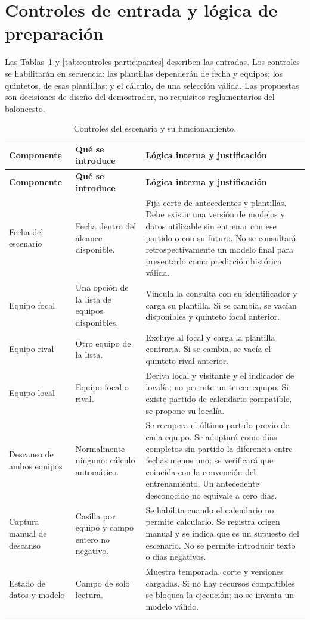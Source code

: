 \section{Controles de entrada y lógica de preparación}
\label{sec:controles-pruebas}
Las Tablas~\ref{tab:controles-escenario} y \ref{tab:controles-participantes} describen las entradas. Los controles se habilitarán en secuencia: las plantillas dependerán de fecha y equipos; los quintetos, de esas plantillas; y el cálculo, de una selección válida. Las propuestas son decisiones de diseño del demostrador, no requisitos reglamentarios del baloncesto.

\begingroup\small{}\setlength{\tabcolsep}{4pt}
\begin{longtable}{@{}>{\raggedright\arraybackslash}p{3.0cm}>{\raggedright\arraybackslash}p{3.1cm}>{\raggedright\arraybackslash}p{8.5cm}@{}}
\caption{Controles del escenario y su funcionamiento.}\label{tab:controles-escenario}\\
\toprule\textbf{Componente}&\textbf{Qué se introduce}&\textbf{Lógica interna y justificación}\\\midrule\endfirsthead
\toprule\textbf{Componente}&\textbf{Qué se introduce}&\textbf{Lógica interna y justificación}\\\midrule\endhead
\bottomrule\endfoot
Fecha del escenario & Fecha dentro del alcance disponible. & Fija corte de antecedentes y plantillas. Debe existir una versión de modelos y datos utilizable sin entrenar con ese partido o con su futuro. No se consultará retrospectivamente un modelo final para presentarlo como predicción histórica válida.\\
Equipo focal & Una opción de la lista de equipos disponibles. & Vincula la consulta con su identificador y carga su plantilla. Si se cambia, se vacían disponibles y quinteto focal anterior.\\
Equipo rival & Otro equipo de la lista. & Excluye al focal y carga la plantilla contraria. Si se cambia, se vacía el quinteto rival anterior.\\
Equipo local & Equipo focal o rival. & Deriva local y visitante y el indicador de localía; no permite un tercer equipo. Si existe partido de calendario compatible, se propone su localía.\\
Descanso de ambos equipos & Normalmente ninguno: cálculo automático. & Se recupera el último partido previo de cada equipo. Se adoptará como días completos sin partido la diferencia entre fechas menos uno; se verificará que coincida con la convención del entrenamiento. Un antecedente desconocido no equivale a cero días.\\
Captura manual de descanso & Casilla por equipo y campo entero no negativo. & Se habilita cuando el calendario no permite calcularlo. Se registra origen manual y se indica que es un supuesto del escenario. No se permite introducir texto o días negativos.\\
Estado de datos y modelo & Campo de solo lectura. & Muestra temporada, corte y versiones cargadas. Si no hay recursos compatibles se bloquea la ejecución; no se inventa un modelo válido.\\
\end{longtable}\endgroup

